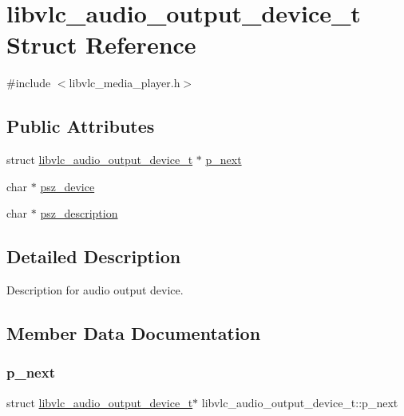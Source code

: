 \hypertarget{structlibvlc__audio__output__device__t}{}\section{libvlc\+\_\+audio\+\_\+output\+\_\+device\+\_\+t Struct Reference}
\label{structlibvlc__audio__output__device__t}


{\ttfamily \#include $<$libvlc\+\_\+media\+\_\+player.\+h$>$}

\subsection*{Public Attributes}
\begin{DoxyCompactItemize}
\item 
struct \hyperlink{structlibvlc__audio__output__device__t}{libvlc\+\_\+audio\+\_\+output\+\_\+device\+\_\+t} $\ast$ \hyperlink{structlibvlc__audio__output__device__t_a5929a73fd007b3bf4af2b392079bbcc1}{p\+\_\+next}
\item 
char $\ast$ \hyperlink{structlibvlc__audio__output__device__t_a263c196000a9a7093a94256fa8556327}{psz\+\_\+device}
\item 
char $\ast$ \hyperlink{structlibvlc__audio__output__device__t_a984dabb3f2ef280399fd308eb47d919f}{psz\+\_\+description}
\end{DoxyCompactItemize}


\subsection{Detailed Description}
Description for audio output device. 

\subsection{Member Data Documentation}
\mbox{\label{structlibvlc__audio__output__device__t_a5929a73fd007b3bf4af2b392079bbcc1}} 
\subsubsection{\texorpdfstring{p\+\_\+next}{p\_next}}
{\footnotesize\ttfamily struct \hyperlink{structlibvlc__audio__output__device__t}{libvlc\+\_\+audio\+\_\+output\+\_\+device\+\_\+t}$\ast$ libvlc\+\_\+audio\+\_\+output\+\_\+device\+\_\+t\+::p\+\_\+next}

